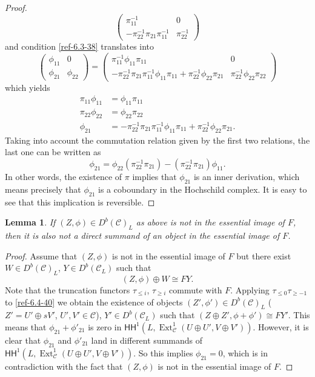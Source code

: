 \documentclass{amsart}
\numberwithin{equation}{section}
\let\cal\mathcal
\newtheorem{lemma}{Lemma}[section]
\theoremstyle{definition}
\theoremstyle{remark}
\begin{document}
\begin{proof}
\[\begin{pmatrix}
\pi_{11}^{-1}&0\\
-\pi_{22}^{-1}\pi_{21}\pi_{11}^{-1}&\pi_{22}^{-1}
\end{pmatrix}
\]
and condition \eqref{ref-6.3-38} translates into
\[
\begin{pmatrix}
\phi_{11}&0\\
\phi_{21}&\phi_{22}
\end{pmatrix}
=
\begin{pmatrix}
\pi^{-1}_{11} \phi_{11} \pi_{11} & 0\\
-\pi^{-1}_{22} \pi_{21} \pi^{-1}_{11} \phi_{11} \pi_{11}+\pi^{-1}_{22}\phi_{22}\pi_{21}
&
\pi^{-1}_{22}\phi_{22}\pi_{22}
\end{pmatrix}
\]
which yields 
\begin{align*}
\pi_{11}\phi_{11}&=\phi_{11}\pi_{11}\\
\pi_{22}\phi_{22}&=\phi_{22}\pi_{22}\\
\phi_{21}&=-\pi^{-1}_{22} \pi_{21} \pi^{-1}_{11} \phi_{11} \pi_{11}+\pi^{-1}_{22}\phi_{22}\pi_{21}.
\end{align*}
Taking into account the commutation relation given by the first
two relations, the last one can be written as
\[
\phi_{21}=\phi_{22} (\pi^{-1}_{22}\pi_{21})-(\pi^{-1}_{22}\pi_{21})\phi_{11}.
\]
In other words, the existence of $\pi$ implies that $\phi_{21}$ is an
inner derivation, which means precisely that $\phi_{21}$ is a coboundary in the Hochschild complex. It is easy to see that this implication is 
reversible. 
\end{proof}
\begin{lemma} 
\label{ref-6.3-39}If $(Z,\phi) \in D^b({{\cal C}})_L$ as above is not in the essential image of $F$,
  then it is also not 
 a direct summand of an object in the
  essential image of $F$.
\end{lemma}
\begin{proof} Assume that $(Z,\phi)$ is not in the essential image of $F$ but there exist
$W\in D^b({{\cal C}})_L$, $Y\in D^b({{\cal C}}_L)$ such that 
\begin{equation}
\label{ref-6.4-40}
(Z,\phi)\oplus W\cong FY.
\end{equation}
Note that the truncation functors $\tau_{\le i}$, $\tau_{\ge i}$
commute with $F$. Applying $\tau_{\le 0}\tau_{\ge -1}$ to
\eqref{ref-6.4-40} we obtain the existence of objects $(Z',\phi')\in
D^b({{\cal C}})_L$ ($Z'=U'\oplus sV'$, $U',V'\in {{\cal C}}$),  $Y'\in
D^b({{\cal C}}_L)$ such that $(Z\oplus Z',\phi+\phi')\cong FY'$. This means
that  $\phi_{21}+\phi'_{21}$ is zero in ${\mathsf{HH}}^1(L,{\operatorname {Ext}}^1_{{\cal C}}(U\oplus U',V\oplus V'))$.
However, it is clear that $\phi_{21}$ and $\phi'_{21}$ land in different summands
of ${\mathsf{HH}}^1(L,{\operatorname {Ext}}^1_{{\cal C}}(U\oplus U',V\oplus V'))$. So this implies $\phi_{21}=0$,
which is in contradiction with the fact that $(Z,\phi)$ is not in the essential image of $F$.
\end{proof}
\end{document}
